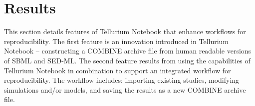 \documentclass[10pt,letterpaper]{article}
\begin{document}



\section*{Results}

This section details features of Tellurium Notebook that enhance workflows for reproducibility. The first feature is an innovation introduced in Tellurium Notebook -- constructing a COMBINE archive file from human readable versions of SBML and SED-ML. The second feature results from using the capabilities of Tellurium Notebook in combination to support an integrated workflow for reproducibility. The workflow includes: importing existing studies, modifying simulations and/or models, and saving the results as a new COMBINE archive file.
\end{document}
